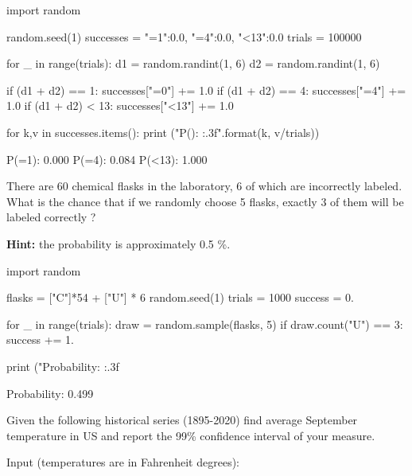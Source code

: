 \begin{ipython}
import random

random.seed(1)
successes = {"=1":0.0, "=4":0.0, "<13":0.0}
trials = 100000

for _ in range(trials):
    d1 = random.randint(1, 6)
    d2 = random.randint(1, 6)

    if (d1 + d2) == 1:
        successes["=0"] += 1.0
    if (d1 + d2) == 4:
        successes["=4"] += 1.0
    if (d1 + d2) < 13:
        successes["<13"] += 1.0

for k,v in successes.items():
    print ("P({}): {:.3f}".format(k, v/trials))

P(=1): 0.000
P(=4): 0.084
P(<13): 1.000
\end{ipython}

\begin{question}
There are 60 chemical flasks in the laboratory, 6 of which are incorrectly labeled. What is the chance that if we randomly choose 5 flasks, exactly 3 of them will be labeled correctly ?

\noindent\textbf{Hint:} the probability is approximately 0.5 \%.
\end{question}

\begin{solution}
\end{solution}

\begin{ipython}
import random

flasks = ["C"]*54 + ["U"] * 6
random.seed(1)
trials = 1000
success = 0.

for _ in range(trials):
    draw = random.sample(flasks, 5)
    if draw.count("U") == 3:
        success += 1.

print ("Probability: {:.3f}%

Probability: 0.499%
\end{ipython}

\begin{question}
Given the following historical series (1895-2020) find average September temperature in US and report the 99\% confidence interval of your measure.

Input (temperatures are in Fahrenheit degrees):
\end{question}

